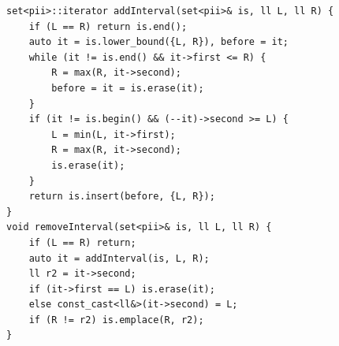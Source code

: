 \begin{lstlisting}
set<pii>::iterator addInterval(set<pii>& is, ll L, ll R) {
    if (L == R) return is.end();
    auto it = is.lower_bound({L, R}), before = it;
    while (it != is.end() && it->first <= R) {
        R = max(R, it->second);
        before = it = is.erase(it);
    }
    if (it != is.begin() && (--it)->second >= L) {
        L = min(L, it->first);
        R = max(R, it->second);
        is.erase(it);
    }
    return is.insert(before, {L, R});
}
void removeInterval(set<pii>& is, ll L, ll R) {
    if (L == R) return;
    auto it = addInterval(is, L, R);
    ll r2 = it->second;
    if (it->first == L) is.erase(it);
    else const_cast<ll&>(it->second) = L;
    if (R != r2) is.emplace(R, r2);
}
\end{lstlisting}
